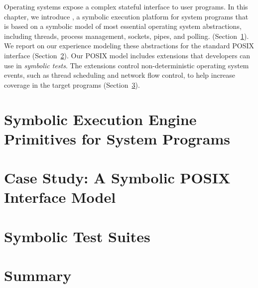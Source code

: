 
Operating systems expose a complex stateful interface to user programs.
%
In this chapter, we introduce \cnine, a symbolic execution platform for system programs that is based on a symbolic model of most essential operating system abstractions, including threads, process management, sockets, pipes, and polling. (Section~\ref{sec:cloud9:primitives}).
%
We report on our experience modeling these abstractions for the standard POSIX interface (Section~\ref{sec:cloud9:posix}).
%
Our POSIX model includes extensions that developers can use in \emph{symbolic tests}.  The extensions control non-deterministic operating system events, such as thread scheduling and network flow control, to help increase coverage in the target programs (Section~\ref{sec:cloud9:symtests}).

\section{Symbolic Execution Engine Primitives for System Programs}
\label{sec:cloud9:primitives}


\section{Case Study: A Symbolic POSIX Interface Model}
\label{sec:cloud9:posix}


\section{Symbolic Test Suites}
\label{sec:cloud9:symtests}


\section{Summary}

